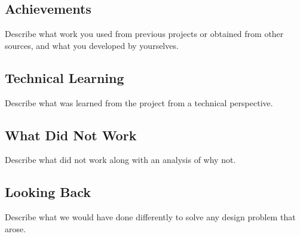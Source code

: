 {\subsection{Achievements}
Describe what work you used from previous projects or obtained from other sources, and what you developed by yourselves.

\subsection{Technical Learning}
Describe what was learned from the project from a technical perspective.

\subsection{What Did Not Work}
Describe what did not work along with an analysis of why not.

\subsection{Looking Back}
Describe what we would have done differently to solve any design problem that arose.

}
